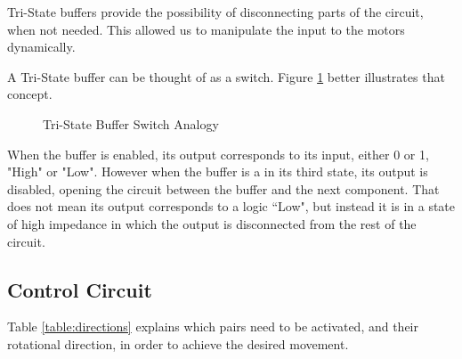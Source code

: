 Tri-State buffers provide the possibility of disconnecting parts of the circuit, when not needed.
This allowed us to manipulate the input to the motors dynamically.

A Tri-State buffer can be thought of as a switch. Figure \ref{fig:tristate} better illustrates that 
concept.
\begin{figure}[htp]
	\begin{center}
	\hspace{2cm}
	\caption{Tri-State Buffer Switch Analogy}
	\label{fig:tristate}
	\end{center}
\end{figure}


When the buffer is enabled, its output corresponds to its input, either 0 or 1, "High" or "Low".
However when the buffer is a in its third state, its output is disabled, opening the circuit 
between the buffer and the next component.
That does not mean its output corresponds to a logic “Low", but instead it is in a state of high 
impedance in which the output is disconnected from the rest of the circuit.
\newpage
\subsection{Control Circuit}\label{sub:circuit}
Table \ref{table:directions} explains which pairs need to be activated, and their rotational 
direction, in order to achieve the desired movement.

